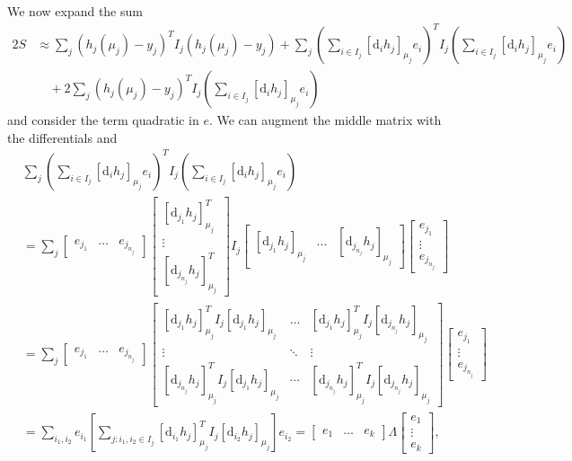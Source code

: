 We now expand the sum
$$
\begin{aligned}
  2S & \approx \sum_j \left( h_j(\mu_j) - y_j \right)^T I_j \left( h_j(\mu_j) - y_j \right) + \sum_j \left( \sum_{i \in I_j} [\mathrm{d}_i h_j]_{\mu_j} e_i \right)^T I_j \left( \sum_{i \in I_j} [\mathrm{d}_i h_j]_{\mu_j} e_i \right) \\
  & \quad + 2 \sum_j \left( h_j(\mu_j) - y_j \right)^T I_j \left( \sum_{i \in I_j} [\mathrm{d}_i h_j]_{\mu_j} e_i \right)
\end{aligned}
$$
and consider the term quadratic in $e$. We can augment the middle matrix with the differentials and 
$$
\begin{aligned}
  & \sum_j \left( \sum_{i \in I_j} [\mathrm{d}_i h_j]_{\mu_j} e_i \right)^T I_j \left( \sum_{i \in I_j} [\mathrm{d}_i h_j]_{\mu_j} e_i \right) \\
  & = \sum_j \begin{bmatrix}
    e_{j_1} & \ldots & e_{j_{n_j}}
  \end{bmatrix} \begin{bmatrix}
    [\mathrm{d}_{j_1} h_j]_{\mu_j}^T \\ \vdots \\ [\mathrm{d}_{j_{n_j}} h_j]_{\mu_j}^T
   \end{bmatrix} I_j \begin{bmatrix}
    [\mathrm{d}_{j_1} h_j]_{\mu_j} & \dots & [\mathrm{d}_{j_{n_j}} h_j]_{\mu_j}
   \end{bmatrix}
   \begin{bmatrix}
    e_{j_1} \\ \vdots \\ e_{j_{n_j}}
  \end{bmatrix} \\
  & = \sum_j \begin{bmatrix}
    e_{j_1} & \ldots & e_{j_{n_j}}
  \end{bmatrix} \begin{bmatrix}
    [\mathrm{d}_{j_1} h_j]_{\mu_j}^T I_j [\mathrm{d}_{j_1} h_j]_{\mu_j} & \dots & [\mathrm{d}_{j_{1}} h_j]_{\mu_j}^T I_j [\mathrm{d}_{j_{n_j}} h_j]_{\mu_j}  \\ \vdots & \ddots & \vdots \\ [\mathrm{d}_{j_{n_j}} h_j]_{\mu_j}^T I_j [\mathrm{d}_{j_{1}} h_j]_{\mu_j} & \cdots & [\mathrm{d}_{j_{n_j}} h_j]_{\mu_j}^T I_j [\mathrm{d}_{j_{n_j}} h_j]_{\mu_j}
   \end{bmatrix}
   \begin{bmatrix}
    e_{j_1} \\ \vdots \\ e_{j_{n_j}}
  \end{bmatrix} \\
  & = \sum_{i_1, i_2} e_{i_1} \left[\sum_{j : i_1, i_2 \in I_j} [\mathrm{d}_{i_1} h_j]_{\mu_j}^T I_j [\mathrm{d}_{i_2} h_j]_{\mu_j} \right]  e_{i_2} = \begin{bmatrix}
    e_1  & \ldots & e_k
  \end{bmatrix} \Lambda \begin{bmatrix}
    e_1  \\ \vdots \\ e_k
  \end{bmatrix},
\end{aligned}
$$
